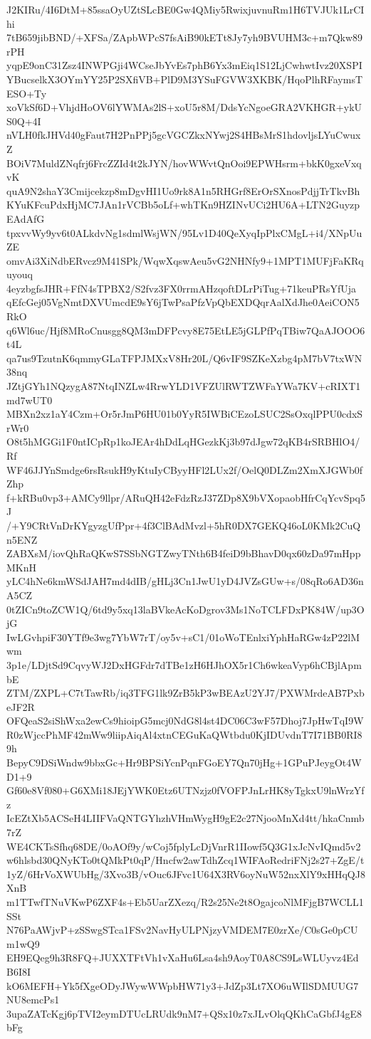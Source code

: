 J2KIRu/4I6DtM+85ssaOyUZtSLcBE0Gw4QMiy5RwixjuvnuRm1H6TVJUk1LrCIhi
7tB659jibBND/+XFSa/ZApbWPcS7fsAiB90kETt8Jy7yh9BVUHM3c+m7Qkw89rPH
yqpE9onC31Zsz4INWPGji4WCseJbYvEs7phB6Yx3mEiq1S12LjCwhwtIvz20XSPI
YBucselkX3OYmYY25P2SXfiVB+PlD9M3YSuFGVW3XKBK/HqoPlhRFaymsTESO+Ty
xoVkSf6D+VhjdHoOV6lYWMAs2lS+xoU5r8M/DdsYcNgoeGRA2VKHGR+ykUS0Q+4I
nVLH0fkJHVd40gFaut7H2PnPPj5gcVGCZkxNYwj2S4HBsMrS1hdovljsLYuCwuxZ
BOiV7MuldZNqfrj6FrcZZId4t2kJYN/hovWWvtQnOoi9EPWHsrm+bkK0gxeVxqvK
quA9N2shaY3Cmijcekzp8mDgvHI1Uo9rk8A1n5RHGrf8ErOrSXnosPdjjTrTkvBh
KYuKFcuPdxHjMC7JAn1rVCBb5oLf+whTKn9HZINvUCi2HU6A+LTN2GuyzpEAdAfG
tpxvvWy9yv6t0ALkdvNg1sdmlWsjWN/95Lv1D40QeXyqIpPlxCMgL+i4/XNpUuZE
omvAi3XiNdbERvcz9M41SPk/WqwXqswAeu5vG2NHNfy9+1MPT1MUFjFaKRquyouq
4eyzbgfsJHR+FfN4sTPBX2/S2fvz3FX0rrmAHzqoftDLrPiTug+71keuPRsYfUja
qEfcGej05VgNmtDXVUmcdE9sY6jTwPsaPfzVpQbEXDQqrAalXdJhe0AeiCON5RkO
q6Wl6uc/Hjf8MRoCnusgg8QM3mDFPcvy8E75EtLE5jGLPfPqTBiw7QaAJOOO6t4L
qa7us9TzutnK6qmmyGLaTFPJMXxV8Hr20L/Q6vIF9SZKeXzbg4pM7bV7txWN38nq
JZtjGYh1NQzygA87NtqINZLw4RrwYLD1VFZUlRWTZWFaYWa7KV+cRIXT1md7wUT0
MBXn2xz1aY4Czm+Or5rJmP6HU01b0YyR5IWBiCEzoLSUC2SsOxqlPPU0cdxSrWr0
O8t5hMGGi1F0ntICpRp1koJEAr4hDdLqHGezkKj3b97dJgw72qKB4rSRBHlO4/Rf
WF46JJYnSmdge6rsRsukH9yKtuIyCByyHFl2LUx2f/OelQ0DLZm2XmXJGWb0fZhp
f+kRBu0vp3+AMCy9llpr/ARuQH42eFdzRzJ37ZDp8X9bVXopaobHfrCqYcvSpq5J
/+Y9CRtVnDrKYgyzgUfPpr+4f3ClBAdMvzl+5hR0DX7GEKQ46oL0KMk2CuQn5ENZ
ZABXsM/iovQhRaQKwS7SSbNGTZwyTNth6B4feiD9bBhavD0qx60zDa97mHppMKnH
yLC4hNe6kmWSdJAH7md4dIB/gHLj3Cn1JwU1yD4JVZsGUw+s/08qRo6AD36nA5CZ
0tZICn9toZCW1Q/6td9y5xq13laBVkeAcKoDgrov3Ms1NoTCLFDxPK84W/up3OjG
IwLGvhpiF30YTf9e3wg7YbW7rT/oy5v+sC1/01oWoTEnlxiYphHaRGw4zP22lMwm
3p1e/LDjtSd9CqvyWJ2DxHGFdr7dTBe1zH6HJhOX5r1Ch6wkeaVyp6hCBjlApmbE
ZTM/ZXPL+C7tTawRb/iq3TFG1lk9ZrB5kP3wBEAzU2YJ7/PXWMrdeAB7PxbeJF2R
OFQeaS2siShWxa2ewCs9hioipG5mcj0NdG8l4st4DC06C3wF57Dhoj7JpHwTqI9W
R0zWjccPhMF42mWw9liipAiqAl4xtnCEGuKaQWtbdu0KjIDUvdnT7I71BB0RI89h
BepyC9DSiWndw9bbxGc+Hr9BPSiYcnPqnFGoEY7Qn70jHg+1GPuPJeygOt4WD1+9
Gf60e8Vf080+G6XMi18JEjYWK0Etz6UTNzjz0fVOFPJnLrHK8yTgkxU9lnWrzYfz
IcEZtXb5ACSeH4LIIFVaQNTGYhzhVHmWygH9gE2c27NjooMnXd4tt/hkaCnmb7rZ
WE4CKTsSfhq68DE/0oAOf9y/wCoj5fplyLcDjVnrR1IIowf5Q3G1xJcNvIQmd5v2
w6hlsbd30QNyKTo0tQMkPt0qP/Hncfw2awTdhZcq1WIFAoRedriFNj2s27+ZgE/t
1yZ/6HrVoXWUbHg/3Xvo3B/vOuc6JFvc1U64X3RV6oyNuW52nxXlY9xHHqQJ8XnB
m1TTwfTNuVKwP6ZXF4s+Eb5UarZXezq/R2s25Ne2t8OgajcoNlMFjgB7WCLL1SSt
N76PaAWjvP+zSSwgSTca1FSv2NavHyULPNjzyVMDEM7E0zrXe/C0sGe0pCUm1wQ9
EH9EQeg9h3R8FQ+JUXXTFtVh1vXaHu6Lsa4sh9AoyT0A8CS9LsWLUyvz4EdB6I8I
kO6MEFH+Yk5fXgeODyJWywWWpbHW71y3+JdZp3Lt7XO6uWIlSDMUUG7NU8emcPs1
3upaZATcKgj6pTVI2eymDTUcLRUdk9nM7+QSx10z7xJLvOlqQKhCaGbfJ4gE8bFg
